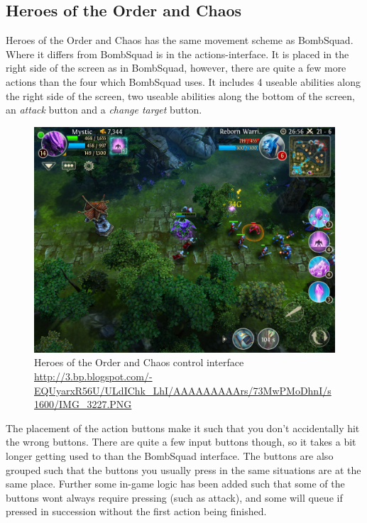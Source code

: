 \subsection*{Heroes of the Order and Chaos}\label{sec:modules:controlscheme:hoftoac}
Heroes of the Order and Chaos\cite{hotoacGP} has the same movement scheme as BombSquad. 
Where it differs from BombSquad is in the actions-interface.
It is placed in the right side of the screen as in BombSquad, however, there are quite a few more actions than the four which BombSquad uses.
It includes 4 useable abilities along the right side of the screen, two useable abilities along the bottom of the screen, an \emph{attack} button and a \emph{change target} button.
\begin{figure}[H]
\centering
\includegraphics[width=1\textwidth]{figures/controlscheme/hotoac_control}
\caption{Heroes of the Order and Chaos control interface \url{http://3.bp.blogspot.com/-EQUyarxR56U/ULdIChk_LhI/AAAAAAAAArs/73MwPMoDhnI/s1600/IMG_3227.PNG}}
\end{figure}

The placement of the action buttons make it such that you don't accidentally hit the wrong buttons. 
There are quite a few input buttons though, so it takes a bit longer getting used to than the BombSquad interface. 
The buttons are also grouped such that the buttons you usually press in the same situations are at the same place. 
Further some in-game logic has been added such that some of the buttons wont always require pressing (such as attack), and some will queue if pressed in succession without the first action being finished.


